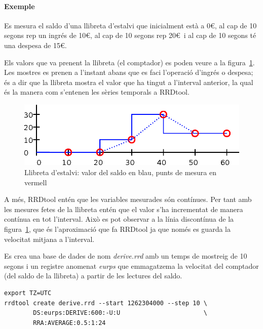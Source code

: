 \paragraph{Exemple} Es mesura el saldo d'una llibreta d'estalvi que inicialment està a 0\euro, al cap de 10 segons rep un ingrés de 10\euro, al cap de 10 segons rep 20\euro\ i al cap de 10 segons té una despesa de 15\euro. 

Els valors que va prenent la llibreta (el comptador) es poden veure a la figura~\ref{fig:rrdtool:mostreig_derive}. Les mostres es prenen a l'instant abans que es faci l'operació d'ingrés o despesa; és a dir que la llibreta mostra el valor que ha tingut a l'interval anterior, la qual és la manera com s'entenen les sèries temporals a RRDtool. 

\begin{figure}[htp]
  \centering
  \includegraphics[width=\textwidth]{imatges/rrdtool/mostreig_derive.eps}
  \caption{Llibreta d'estalvi: valor del saldo en blau, punts de mesura en vermell}
  \label{fig:rrdtool:mostreig_derive}
\end{figure}

A més, RRDtool entén que les variables mesurades són contínues. Per tant amb les mesures fetes de la llibreta entén que el valor s'ha incrementat de manera contínua en tot l'interval. Això es pot observar a la línia discontínua de la figura~\ref{fig:rrdtool:mostreig_derive}, que és l'aproximació que fa RRDtool ja que només es guarda la velocitat mitjana a l'interval.

Es crea una base de dades de nom \emph{derive.rrd} amb un temps de mostreig de 10 segons i un registre anomenat \emph{eurps} que emmagatzema la velocitat del comptador (del saldo de la llibreta) a partir de les lectures del saldo. 

\begin{lstlisting}[style=sh]
export TZ=UTC
rrdtool create derive.rrd --start 1262304000 --step 10 \
        DS:eurps:DERIVE:600:-U:U                       \ 
        RRA:AVERAGE:0.5:1:24                                                   
\end{lstlisting}


